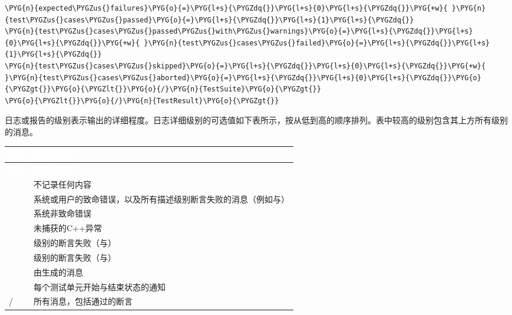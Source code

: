 \begin{codeblockbg}
\begin{Verbatim}[commandchars=\\\{\},breaklines=true,breakanywhere=true,fontsize=\codefont,xleftmargin=17bp]
\PYG{n}{expected\PYGZus{}failures}\PYG{o}{=}\PYG{l+s}{\PYGZdq{}}\PYG{l+s}{0}\PYG{l+s}{\PYGZdq{}}\PYG{+w}{ }\PYG{n}{test\PYGZus{}cases\PYGZus{}passed}\PYG{o}{=}\PYG{l+s}{\PYGZdq{}}\PYG{l+s}{1}\PYG{l+s}{\PYGZdq{}}
\PYG{n}{test\PYGZus{}cases\PYGZus{}passed\PYGZus{}with\PYGZus{}warnings}\PYG{o}{=}\PYG{l+s}{\PYGZdq{}}\PYG{l+s}{0}\PYG{l+s}{\PYGZdq{}}\PYG{+w}{ }\PYG{n}{test\PYGZus{}cases\PYGZus{}failed}\PYG{o}{=}\PYG{l+s}{\PYGZdq{}}\PYG{l+s}{1}\PYG{l+s}{\PYGZdq{}}
\PYG{n}{test\PYGZus{}cases\PYGZus{}skipped}\PYG{o}{=}\PYG{l+s}{\PYGZdq{}}\PYG{l+s}{0}\PYG{l+s}{\PYGZdq{}}\PYG{+w}{ }\PYG{n}{test\PYGZus{}cases\PYGZus{}aborted}\PYG{o}{=}\PYG{l+s}{\PYGZdq{}}\PYG{l+s}{0}\PYG{l+s}{\PYGZdq{}}\PYG{o}{\PYGZgt{}}\PYG{o}{\PYGZlt{}}\PYG{o}{/}\PYG{n}{TestSuite}\PYG{o}{\PYGZgt{}}
\PYG{o}{\PYGZlt{}}\PYG{o}{/}\PYG{n}{TestResult}\PYG{o}{\PYGZgt{}}
\end{Verbatim}
\end{codeblockbg}



日志或报告的级别表示输出的详细程度。日志详细级别的可选值如下表所示，按从低到高的顺序排列。表中较高的级别包含其上方所有级别的消息。



\myTableBegin
\begin{xltabular}{\textwidth}{|>{\hsize\raggedright\arraybackslash}X|>{\hsize\raggedright\arraybackslash}X|}
\hline
{} \textcolor{white}{\textbf{级别}} & \textcolor{white}{\textbf{报告的消息}} \\
\hline
\endfirsthead
{} \textcolor{white}{\textbf{级别}} & \textcolor{white}{\textbf{报告的消息}} \\
\hline
\endhead
{} & 不记录任何内容\\
\hline
{} & 系统或用户的致命错误，以及所有描述级别断言失败的消息（例如与）\\
\hline
{} & 系统非致命错误\\
\hline
{} & 未捕获的C++异常\\
\hline
{} & 级别的断言失败（与）\\
\hline
{} & 级别的断言失败（与）\\
\hline
{} & 由生成的消息\\
\hline
{} & 每个测试单元开始与结束状态的通知\\
\hline
{} /  & 所有消息，包括通过的断言\\
\hline
\end{xltabular}
\myTableEnd


